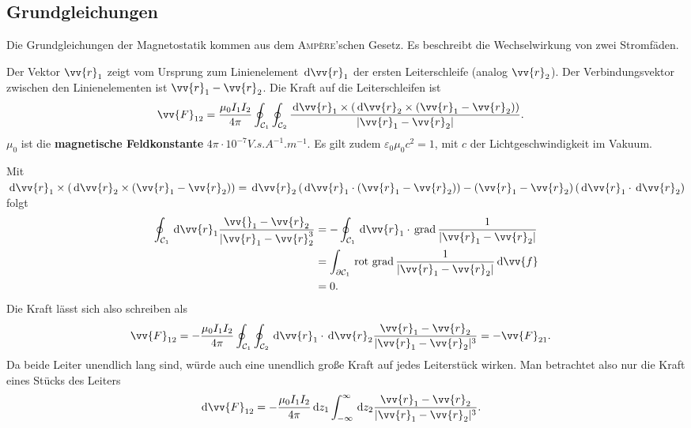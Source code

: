 \documentclass[a4paper,12pt]{article}
\newcommand{\td}{\,\text{d}}
\numberwithin{equation}{section}
\begin{document}
\subsection{Grundgleichungen}
Die Grundgleichungen der Magnetostatik kommen aus dem \textsc{Amp\`ere}'schen Gesetz. Es beschreibt die Wechselwirkung von zwei Stromfäden.\par
Der Vektor $\vv{r}_1$ zeigt vom Ursprung zum Linienelement $\td \vv{r}_1$ der ersten Leiterschleife (analog $\vv{r}_2$). Der Verbindungsvektor zwischen den Linienelementen ist $\vv{r}_1-\vv{r}_2$.
Die Kraft auf die Leiterschleifen ist
\begin{align} 
        \vv{F}_{12}&=\dfrac{\mu _0I_1I_2}{4\pi }\oint_{\mathcal{C}_1}^{}\oint_{\mathcal{C}_2}^{}\dfrac{\td \vv{r}_1\times \left(\td \vv{r}_2\times \left(\vv{r}_1-\vv{r}_2\right)\right)}{|\vv{r}_1-\vv{r}_2|}
.\end{align} 
$\mu _0$ ist die \textbf{magnetische Feldkonstante} $4\pi \cdot 10^{-7}\unit{V.s.A^{-1}.m^{-1}}$.
Es gilt zudem $\varepsilon _0\mu _0c^2=1$, mit $c$ der Lichtgeschwindigkeit im Vakuum.\par
Mit $\td \vv{r}_1\times \left(\td \vv{r}_2\times \left(\vv{r}_1-\vv{r}_2\right)\right)=\td \vv{r}_2\left(\td \vv{r}_1\cdot \left(\vv{r}_1-\vv{r}_2\right)\right)-\left(\vv{r}_1-\vv{r}_2\right)\left(\td \vv{r}_1\cdot \td \vv{r}_2\right)$ folgt
\begin{align} 
        \oint_{\mathcal{C}_1}^{}\td \vv{r}_1\dfrac{\vv{}_1-\vv{r}_2}{|\vv{r}_1-\vv{r}_2^3}&=-\oint_{\mathcal{C}_1}^{}\td \vv{r}_1\cdot \,\text{grad}\,\dfrac{1}{|\vv{r}_1-\vv{r}_2|}\\
                                                                                          &=\int_{\partial \mathcal{C}_1}^{}\,\text{rot}\,\,\text{grad}\,\dfrac{1}{|\vv{r}_1-\vv{r}_2|}\td \vv{f}\\
                                                                                          &=0
.\end{align} 
Die Kraft lässt sich also schreiben als
\begin{align} 
        \vv{F}_{12}&=-\dfrac{\mu _0I_1I_2}{4\pi }\oint_{\mathcal{C}_1}^{}\oint_{\mathcal{C}_2}^{}\td \vv{r}_1\cdot \td \vv{r}_2\dfrac{\vv{r}_1-\vv{r}_2}{|\vv{r}_1-\vv{r}_2|^3}=-\vv{F}_{21}
.\end{align} 
Da beide Leiter unendlich lang sind, würde auch eine unendlich große Kraft auf jedes Leiterstück wirken.
Man betrachtet also nur die Kraft eines Stücks des Leiters
\begin{align} 
        \td \vv{F}_{12}&=-\dfrac{\mu _0I_1I_2}{4\pi }\td z_1\int_{-\infty}^{\infty}\td z_2\dfrac{\vv{r}_1-\vv{r}_2}{|\vv{r}_1-\vv{r}_2|^3}
.\end{align} 
\end{document}
